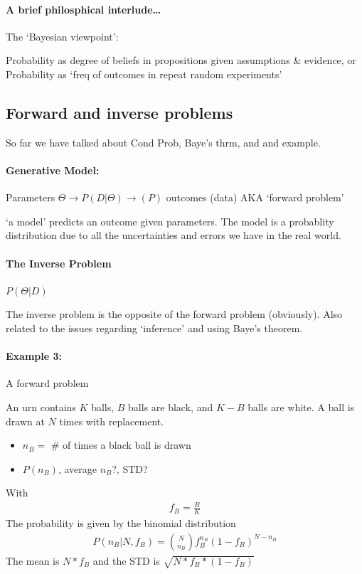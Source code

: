 \documentclass[../main.tex]{subfiles}
\begin{document}
\paragraph{A brief philosphical interlude\dots}
The `Bayesian viewpoint':

Probability as degree of beliefs in propositions given assumptions \& evidence, or 
Probability as `freq of outcomes in repeat random experiments'

\subsection*{Forward and inverse problems}

So far we have talked about Cond Prob, Baye's thrm, and and example.

\paragraph{Generative Model:} Parameters $\Theta \rightarrow P(D|\Theta) \rightarrow (P)$ outcomes
(data) AKA `forward problem'

`a model' predicts an outcome given parameters. The model is a probablity distribution due to all 
the uncertainties and errors we have in the real world. 

\paragraph{The Inverse Problem} $P(\Theta|D)$

The inverse problem is the opposite of the forward problem (obviously). Also related to the issues
regarding `inference' and using Baye's theorem.

\paragraph{Example 3:} A forward problem

An urn contains $K$ balls, $B$ balls are black, and $K-B$ balls are white. A ball is drawn at $N$
times with replacement.

\begin{itemize}
    \item $n_B = $ \# of times a black ball is drawn 
    \item $P(n_B)$, average $n_B$?, STD?
\end{itemize}
With
\begin{align*}
    f_B = \frac{B}{K}
\end{align*}
The probability is given by the binomial distribution
\begin{align*}
    P(n_B|N,f_B) = \binom{N}{n_B} f_B^{n_B} (1-f_B)^{N-n_B}
\end{align*}
The mean is $N*f_B$ and the STD is $\sqrt{N*f_B*(1-f_B)}$
\end{document}
